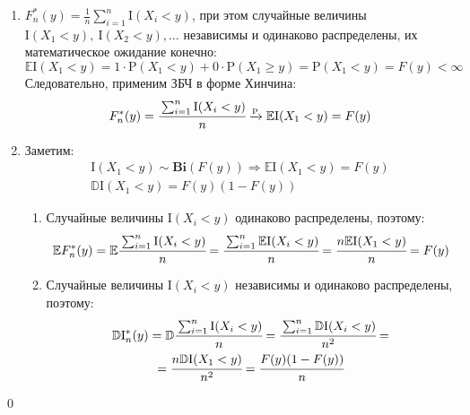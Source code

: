\documentclass[oneside,final,14pt]{extreport}
\renewenvironment{proof}{{\bfseries Доказательство.}}{\qed}
\theoremstyle{definition}
\begin{document}
\begin{proof}\leavevmode
\begin{enumerate}
    \item $F_{n}^{*}(y)=\frac{1}{n} \sum_{i=1}^{n} \mathrm{I}(X_{i}<y)$, при этом случайные величины $\mathrm{I}(X_{1}<y),~ \mathrm{I}(X_{2}<y), \ldots$ независимы и одинаково распределены, их математическое ожидание конечно:
    \begin{equation*}
        \mathbb{E}\mathrm{I}(X_{1}<y)=1 \cdot \mathrm{P}(X_{1}<y)+0 \cdot \mathrm{P}(X_{1} \geqslant y)=\mathrm{P}(X_{1}<y)=F(y)<\infty
    \end{equation*}
    Следовательно, применим ЗБЧ в форме Хинчина:
    \begin{equation*}
        F_{n}^{*}(y)=\cfrac{\sum_{i=1}^{n} \mathrm{I}(X_{i}<y)}{n} \xrightarrow[]{\mathrm{p}} \mathbb{E}\mathrm{I}(X_{1}<y)=F(y) 
    \end{equation*}
    \item Заметим:
    \begin{gather*}
        \mathrm{I}(X_{1}<y) \sim  \mathbf{Bi}(F(y)) \Rightarrow \mathbb{E}\mathrm{I}(X_{1}<y) = F(y) \\
        \mathbb{D}\mathrm{I}(X_{1}<y) = F(y)(1-F(y))
    \end{gather*}
    \begin{enumerate}[label={\arabic*)}]
        \item Случайные величины $\mathrm{I}(X_{i}<y)$ одинаково распределены, поэтому:
        \begin{equation*}
            \mathbb{E} F_{n}^{*}(y)=\mathbb{E} \cfrac{\sum_{i=1}^{n} \mathrm{I}(X_{i}<y)}{n}=\cfrac{\sum_{i=1}^{n} \mathbb{E}\mathrm{I}(X_{i}<y)}{n}=\cfrac{n \mathbb{E}\mathrm{I}(X_{1}<y)}{n}=F(y)  
        \end{equation*}
        
        \item Случайные величины $\mathrm{I}(X_{i}<y)$ независимы и одинаково распределены, поэтому:
        \begin{multline*}
            \mathbb{D}\mathrm{I}_{n}^{*}(y)
            = \mathbb{D} \cfrac{\sum_{i=1}^{n} \mathrm{I}(X_{i}<y)}{n}
            = \cfrac{\sum_{i=1}^{n} \mathbb{D}\mathrm{I}(X_{i}<y)}{n^{2}}
            = \\
            = \cfrac{n\mathbb{D}\mathrm{I}(X_{1}<y)}{n^{2}}
            = \cfrac{F(y)(1-F(y))}{n}
        \end{multline*}
    

\end{enumerate}
\end{enumerate}
\end{proof}
\end{document}

